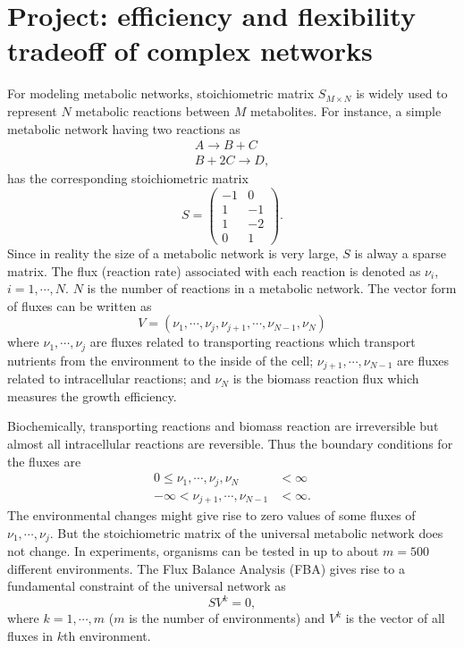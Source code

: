 \documentclass[paper=a4, fontsize=12pt]{scrartcl}	%
\numberwithin{equation}{section}					%
\numberwithin{figure}{section}					%
\numberwithin{table}{section}					%
\begin{document}
\section*{Project: efficiency and flexibility tradeoff of complex networks}
For modeling metabolic networks, stoichiometric matrix $S_{M\times N}$ is widely used to represent $N$ metabolic reactions between $M$ metabolites. For instance, a simple metabolic network having two reactions as 
\begin{eqnarray}
\nonumber A\rightarrow B + C\\
\nonumber B+2C\rightarrow D,
\end{eqnarray}
has the corresponding stoichiometric matrix 
\begin{equation}
\nonumber S=\left(\begin{array}{cc}-1 & 0 \\1 & -1 \\1 & -2 \\0 & 1\end{array}\right). 
\end{equation}
Since in reality the size of a metabolic network is very large, $S$ is alway a sparse matrix. The flux (reaction rate) associated with each reaction is denoted as $\nu_i$, $i=1,\cdots,N$. $N$ is the number of reactions in a metabolic network. The vector form of fluxes can be written as 
\begin{equation}
\nonumber
V=(\nu_1, \cdots, \nu_j, \nu_{j+1}, \cdots, \nu_{N-1}, \nu_N)
\end{equation}
where $\nu_1, \cdots, \nu_j$ are fluxes related to transporting reactions which transport nutrients from the environment to the inside of the cell; $\nu_{j+1}, \cdots, \nu_{N-1}$ are fluxes related to intracellular reactions; and $\nu_N$ is the biomass reaction flux which measures the growth efficiency. 

Biochemically, transporting reactions and biomass reaction are irreversible but almost all intracellular reactions are reversible. Thus the boundary conditions for the fluxes are
\begin{align}
\nonumber
    0\leq \nu_1, \cdots, \nu_j, \nu_N&<\infty   \\
 \nonumber     -\infty<\nu_{j+1}, \cdots, \nu_{N-1}&<\infty.
\end{align}
The environmental changes might give rise to zero values of some fluxes of $\nu_1, \cdots, \nu_j$. But the stoichiometric matrix of the universal metabolic network does not change.  In experiments, organisms can be tested in up to about $m=500$ different environments. The Flux Balance Analysis (FBA) gives rise to a fundamental constraint of the universal network as
\begin{equation}
\nonumber S V^k=0, 
\end{equation}
where $k=1, \cdots, m$ ($m$ is the number of environments) and $V^k$ is the vector of all fluxes in $k$th environment. 
\end{document}
